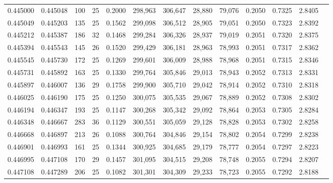 \begin{tabular}{rrrrrrrrrrrrr}
0.445000 & 0.445048 &   100 &  25 &                                     0.2000 & 298,963 & 306,647 &  28,880 &  79,076 & 0.2050 & 0.7325 & 2.8405 \\
0.445049 & 0.445203 &   135 &  25 &                                     0.1562 & 299,098 & 306,512 &  28,905 &  79,051 & 0.2050 & 0.7323 & 2.8392 \\
0.445212 & 0.445387 &   186 &  32 &                                     0.1468 & 299,284 & 306,326 &  28,937 &  79,019 & 0.2051 & 0.7320 & 2.8375 \\
0.445394 & 0.445543 &   145 &  26 &                                     0.1520 & 299,429 & 306,181 &  28,963 &  78,993 & 0.2051 & 0.7317 & 2.8362 \\
0.445545 & 0.445730 &   172 &  25 &                                     0.1269 & 299,601 & 306,009 &  28,988 &  78,968 & 0.2051 & 0.7315 & 2.8346 \\
0.445731 & 0.445892 &   163 &  25 &                                     0.1330 & 299,764 & 305,846 &  29,013 &  78,943 & 0.2052 & 0.7313 & 2.8331 \\
0.445897 & 0.446007 &   136 &  29 &                                     0.1758 & 299,900 & 305,710 &  29,042 &  78,914 & 0.2052 & 0.7310 & 2.8318 \\
0.446025 & 0.446190 &   175 &  25 &                                     0.1250 & 300,075 & 305,535 &  29,067 &  78,889 & 0.2052 & 0.7308 & 2.8302 \\
0.446194 & 0.446347 &   193 &  25 &                                     0.1147 & 300,268 & 305,342 &  29,092 &  78,864 & 0.2053 & 0.7305 & 2.8284 \\
0.446348 & 0.446667 &   283 &  36 &                                     0.1129 & 300,551 & 305,059 &  29,128 &  78,828 & 0.2053 & 0.7302 & 2.8258 \\
0.446668 & 0.446897 &   213 &  26 &                                     0.1088 & 300,764 & 304,846 &  29,154 &  78,802 & 0.2054 & 0.7299 & 2.8238 \\
0.446901 & 0.446993 &   161 &  25 &                                     0.1344 & 300,925 & 304,685 &  29,179 &  78,777 & 0.2054 & 0.7297 & 2.8223 \\
0.446995 & 0.447108 &   170 &  29 &                                     0.1457 & 301,095 & 304,515 &  29,208 &  78,748 & 0.2055 & 0.7294 & 2.8207 \\
0.447108 & 0.447289 &   206 &  25 &                                     0.1082 & 301,301 & 304,309 &  29,233 &  78,723 & 0.2055 & 0.7292 & 2.8188 \\

\end{tabular}
